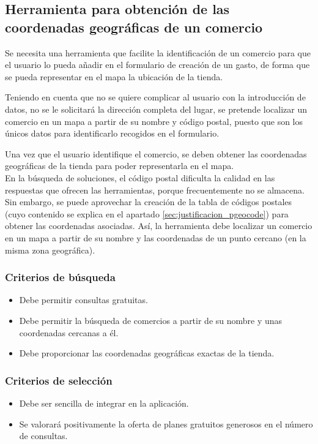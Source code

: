 \subsection{Herramienta para obtención de las coordenadas geográficas de un comercio}
Se necesita una herramienta que facilite la identificación de un comercio para que el usuario lo pueda añadir en el formulario de creación de un gasto, de forma que se pueda representar en el mapa la ubicación de la tienda.

Teniendo en cuenta que no se quiere complicar al usuario con la introducción de datos, no se le solicitará la dirección completa del lugar, se pretende localizar un comercio en un mapa a partir de su nombre y código postal, puesto que son los únicos datos para identificarlo recogidos en el formulario.

Una vez que el usuario identifique el comercio, se deben obtener las coordenadas geográficas de la tienda para poder representarla en el mapa.\\

En la búsqueda de soluciones, el código postal dificulta la calidad en las respuestas que ofrecen las herramientas, porque frecuentemente no se almacena. Sin embargo, se puede aprovechar la creación de la tabla de códigos postales (cuyo contenido se explica en el apartado \ref{sec:justificacion_pgeocode}) para obtener las coordenadas asociadas. Así, la herramienta debe localizar un comercio en un mapa a partir de su nombre y las coordenadas de un punto cercano (en la misma zona geográfica).

\subsubsection{Criterios de búsqueda}
\begin{itemize}
    \item Debe permitir consultas gratuitas.
    \item Debe permitir la búsqueda de comercios a partir de su nombre y unas coordenadas cercanas a él.
    \item Debe proporcionar las coordenadas geográficas exactas de la tienda.
\end{itemize}

\subsubsection{Criterios de selección}
\begin{itemize}
    \item Debe ser sencilla de integrar en la aplicación.
    \item Se valorará positivamente la oferta de planes gratuitos generosos en el número de consultas.
\end{itemize}

